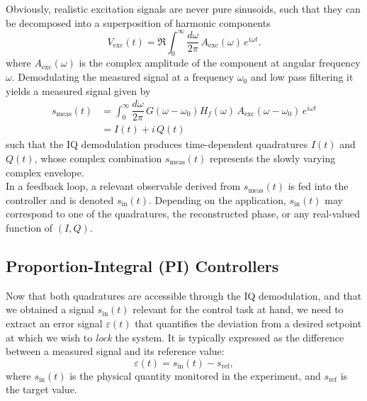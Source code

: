 Obviously, realistic excitation signals are never pure sinusoids, such that they can be decomposed into a superposition of harmonic components
\begin{equation*}
V_{\mathrm{exc}}(t) = \Re{\int_{0}^{\infty} \dfrac{d\omega}{2\pi} \, A_{\mathrm{exc}}(\omega) \, e^{i\omega t}}.
\end{equation*} 
where $A_{\mathrm{exc}}(\omega)$ is the complex amplitude of the component at angular frequency $\omega$. Demodulating the measured signal at a frequency $\omega_0$ and low pass filtering it yields a measured signal given by 
\begin{equation}
\begin{split}
s_{\mathrm{meas}}(t) &= \int_{0}^{\infty} \dfrac{d\omega}{2\pi} \, G(\omega- \omega_0) H_f(\omega) \, A_{\mathrm{exc}}(\omega-\omega_0) \, e^{i\omega t} \\
& = I(t) + i \, Q(t)
\end{split}
\end{equation}
such that the IQ demodulation produces time-dependent quadratures $I(t)$ and $Q(t)$, whose complex combination $s_{\mathrm{meas}}(t)$ represents the slowly varying complex envelope. \\ 

In a feedback loop, a relevant observable derived from $s_{\mathrm{meas}}(t)$ is fed into the controller and is denoted $s_{\mathrm{in}}(t)$. Depending on the application, $s_{\mathrm{in}}(t)$ may correspond to one of the quadratures, the reconstructed phase, or any real-valued function of $(I,Q)$. 


\subsection{Proportion-Integral (PI) Controllers}
Now that both quadratures are accessible through the IQ demodulation, and that we obtained a signal $s_{\mathrm{in}}(t)$ relevant for the control task at hand, we need to extract an error signal \( \varepsilon(t) \) that quantifies the deviation from a desired setpoint at which we wish to \textit{lock} the system. It is typically expressed as the difference between a measured signal and its reference value:
\begin{equation}
    \varepsilon(t) = s_{\text{in}}(t) - s_{\text{ref}},
\end{equation}
where \( s_{\text{in}}(t) \) is the physical quantity monitored in the experiment, and \( s_{\text{ref}} \) is the target value.\\ 

